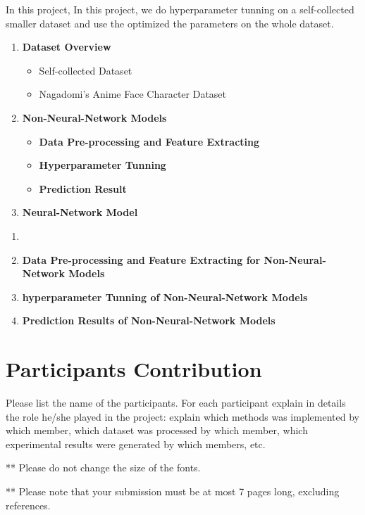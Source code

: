 \documentclass[11.5pt]{article}
\begin{document}
In this project, 
In this project, we do hyperparameter tunning on a self-collected smaller dataset and use the optimized the parameters on the whole dataset. 

\begin{enumerate}
    \item \textbf{Dataset Overview}
        \begin{itemize}
            \item Self-collected Dataset
            \item Nagadomi’s Anime Face Character Dataset
        \end{itemize}
    \item \textbf{Non-Neural-Network Models}
        \begin{itemize}
            \item \textbf{Data Pre-processing and Feature Extracting}
            \item \textbf{Hyperparameter Tunning}
            \item \textbf{Prediction Result}
        \end{itemize}
    \item \textbf{Neural-Network Model}
        \
\end{enumerate}
\begin{enumerate}
    \item 
    \item \textbf{Data Pre-processing and Feature Extracting for Non-Neural-Network Models}
    \item \textbf{hyperparameter Tunning of Non-Neural-Network Models}
    \item \textbf{Prediction Results of Non-Neural-Network Models}
\end{enumerate}

\section{Participants Contribution}
Please list the name of the participants. For each participant explain in details the role he/she played in the project: explain which methods was implemented by which member, which dataset was processed by which member, which experimental results were generated by which members, etc.

\vspace{10mm}
** Please do not change the size of the fonts.

** Please note that your submission must be at most 7 pages long, excluding references.
\end{document}
